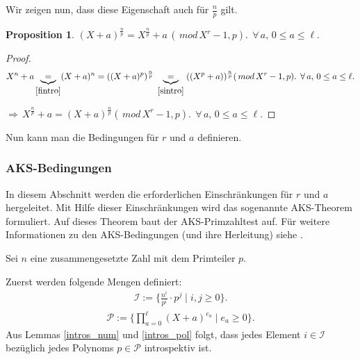 \documentclass[12pt,oneside]{article}
\newtheorem{prop}{Proposition}[section]
\theoremstyle{remark}
\theoremstyle{definition}
\begin{document}
\begin{flushleft}
Wir zeigen nun, dass diese Eigenschaft auch für $\frac{n}{p}$ gilt.\newline

\begin{prop}
$(X + a)^{\frac{n}{p}} = X^{\frac{n}{p}} + a \, (\, mod \, X^r -1,p). \; \, \forall\,a, \,  0 \leq a \leq \ell.$
\end{prop}
\begin{proof}
\begin{align*}
    X^{n} + a \underbrace{=}_{\ref{fintro}} (X + a)^n = ((X + a)^{p})^{\frac{n}{p}} \; \underbrace{=}_{\ref{sintro}} \; ((X^{p} + a))^{\frac{n}{p}} (\, mod \, X^r - 1,p). \; \, \forall\,a, \, 0 \leq a \leq \ell.
\end{align*}

$\Rightarrow \, X^{\frac{n}{p}} + a = (X + a)^{\frac{n}{p}} (\, mod \, X^r - 1,p). \; \, \forall\,a, \, 0 \leq a \leq \ell.$
\end{proof}

Nun kann man die Bedingungen für $r$ und $a$ definieren. 

\subsubsection{AKS-Bedingungen}
In diesem Abschnitt werden die erforderlichen Einschränkungen für $r$ und $a$ hergeleitet. Mit Hilfe dieser Einschränkungen wird das sogenannte AKS-Theorem formuliert. Auf dieses Theorem baut der AKS-Primzahltest auf. Für weitere Informationen zu den AKS-Bedingungen (und ihre Herleitung) siehe \cite{akalin}.  

Sei $n$ eine zusammengesetzte Zahl mit dem Primteiler $p$. 

Zuerst werden folgende Mengen definiert:\newline\newline
\begin{align*}\label{I_Set}
      \mathcal{I} := \{ \frac{n^i}{p^i} \cdot p^j \mid i,j \geq 0\}.
\end{align*}
\begin{align*}
     \mathcal{P} := \{ \prod_{a = 0}^{\ell} (X + a)^{e_{a}} \mid e_{a} \geq 0 \}.
\end{align*}\label{P_Set}
\newline\newline
Aus Lemmas \ref{intros_num} und \ref{intros_pol} folgt, dass jedes Element $i \in \mathcal{I}$ bezüglich jedes Polynoms $p \in \mathcal{P}$ introspektiv ist.\newline\newline


\end{flushleft}
\end{document}
